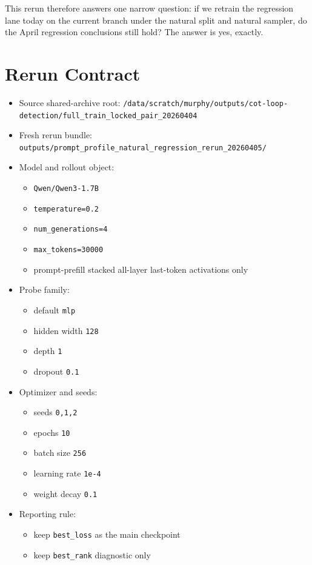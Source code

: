 \documentclass[11pt]{article}
\begin{document}
This rerun therefore answers one narrow question: if we retrain the regression
lane today on the current branch under the natural split and natural sampler, do
the April regression conclusions still hold? The answer is yes, exactly.

\section{Rerun Contract}

\begin{itemize}
\item Source shared-archive root:
  \texttt{/data/scratch/murphy/outputs/cot-loop-detection/full\_train\_locked\_pair\_20260404}
\item Fresh rerun bundle:
  \texttt{outputs/prompt\_profile\_natural\_regression\_rerun\_20260405/}
\item Model and rollout object:
  \begin{itemize}
  \item \texttt{Qwen/Qwen3-1.7B}
  \item \texttt{temperature=0.2}
  \item \texttt{num\_generations=4}
  \item \texttt{max\_tokens=30000}
  \item prompt-prefill stacked all-layer last-token activations only
  \end{itemize}
\item Probe family:
  \begin{itemize}
  \item default \texttt{mlp}
  \item hidden width \texttt{128}
  \item depth \texttt{1}
  \item dropout \texttt{0.1}
  \end{itemize}
\item Optimizer and seeds:
  \begin{itemize}
  \item seeds \texttt{0,1,2}
  \item epochs \texttt{10}
  \item batch size \texttt{256}
  \item learning rate \texttt{1e-4}
  \item weight decay \texttt{0.1}
  \end{itemize}
\item Reporting rule:
  \begin{itemize}
  \item keep \texttt{best\_loss} as the main checkpoint
  \item keep \texttt{best\_rank} diagnostic only
  \end{itemize}
\end{itemize}
\end{document}
